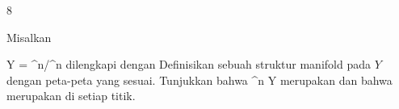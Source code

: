 {8}
{

Misalkan

\mavergleichskette
{\vergleichskette
{ Y
}
{ = }{ \R^n/\Z^n
}
{  }{
}
{    }{
}
{   }{
}
}
{}{}{}
dilengkapi dengan
Definisikan sebuah struktur manifold pada $Y$ dengan peta-peta yang sesuai. Tunjukkan bahwa
\maabbdisp {\varphi} {\R^n } { Y
} {}
merupakan
dan bahwa
merupakan
di setiap titik.

}
{} {}
